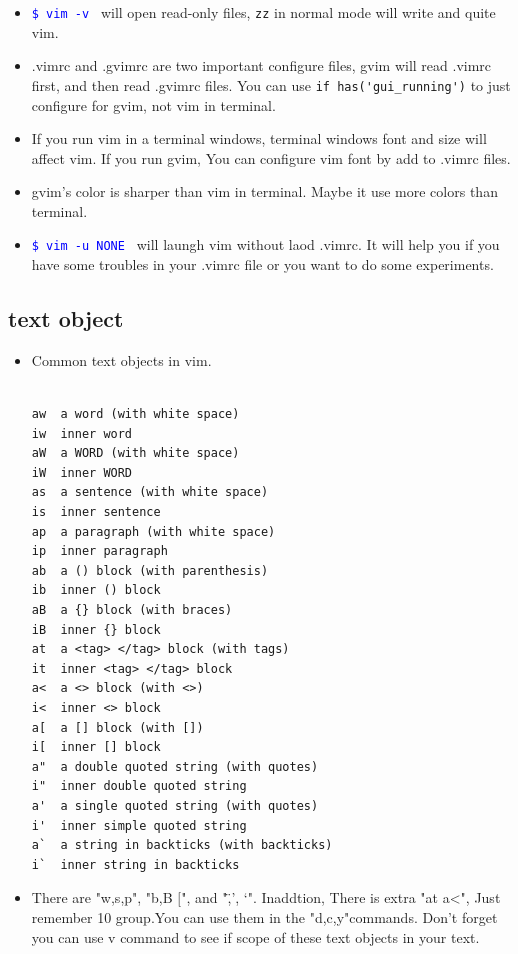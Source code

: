 \documentclass[a4paper,12pt,twoside]{book}
\newcommand{\linuxcommand}[1]{\texttt{\textcolor{blue}{\$ #1 \Pisymbol{psy}{191}}}}
\begin{document}
\begin{itemize}
\item \linuxcommand{vim -v} will open read-only files, \verb!zz! in normal mode  will write and quite vim.

\item .vimrc and .gvimrc are two important configure files, gvim  will read .vimrc first, and then read .gvimrc files.  You can use \verb=if has('gui_running')= to just configure for gvim, not vim in terminal. 

\item If you run vim in a terminal windows, terminal windows font and size will affect vim.  If you run gvim, You can configure vim font by add to .vimrc files.  

\item gvim's color is sharper than vim in terminal.  Maybe it use more colors than terminal.  

\item \linuxcommand{vim -u NONE} will laungh vim without laod .vimrc. It will
    help you if you have some troubles in your .vimrc file or you want to do
    some experiments. 
\end{itemize}

\subsection{text object}
\begin{itemize}
		\item Common text objects in vim. 
\begin{verbatim}

aw	a word (with white space)
iw	inner word
aW	a WORD (with white space)
iW	inner WORD
as	a sentence (with white space)
is	inner sentence
ap	a paragraph (with white space)
ip	inner paragraph
ab	a () block (with parenthesis)
ib	inner () block
aB	a {} block (with braces)
iB	inner {} block
at	a <tag> </tag> block (with tags)
it	inner <tag> </tag> block
a<	a <> block (with <>)
i<	inner <> block
a[	a [] block (with [])
i[	inner [] block
a"	a double quoted string (with quotes)
i"	inner double quoted string
a'	a single quoted string (with quotes)
i'	inner simple quoted string
a`	a string in backticks (with backticks)
i`	inner string in backticks

\end{verbatim}
\item There are "w,s,p", "b,B $[$", and "\",', `". Inaddtion, There is extra "at a<", Just remember 10 group.You can use them in the "d,c,y"commands. Don't forget you can use v command to see if scope of these text objects in your text.
				
		\end{itemize}
\end{document}
